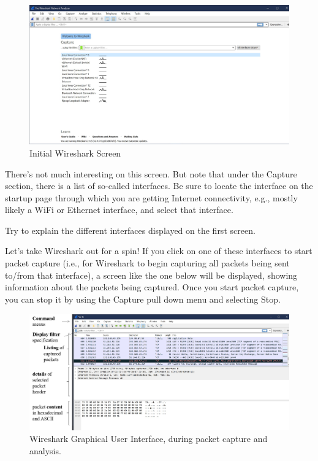 \documentclass[11pt,a4paper]{article}
\begin{document}
\begin{figure}[h]
    \includegraphics[width=\textwidth]{start_screen.jpg}
    \caption{Initial Wireshark Screen}\label{fig:init-screen}
\end{figure}

There's not much interesting on this screen. But note that under the Capture section,
there is a list of so-called interfaces. Be sure to locate the interface on the startup page through which you are getting Internet
connectivity, e.g., mostly likely a WiFi or Ethernet interface, and select that interface.

\begin{question}
    Try to explain the different interfaces displayed on the first screen.
\end{question}

Let's take Wireshark out for a spin! If you click on one of these interfaces to start packet
capture (i.e., for Wireshark to begin capturing all packets being sent to/from that
interface), a screen like the one below will be displayed, showing information about the
packets being captured. Once you start packet capture, you can stop it by using the
Capture pull down menu and selecting Stop.

\begin{figure}[H]
    \includegraphics[width=\textwidth]{capturing.png}
    \caption{Wireshark Graphical User Interface, during packet capture and analysis.}%
    \label{fig:packet_capt}
\end{figure}
\end{document}
